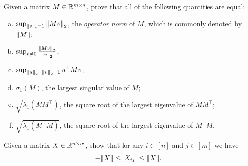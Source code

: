 \begin{myexercise}
    Given a matrix $M \in \mathbb{R}^{m \times n}$, prove that all of the following quantities are equal:
    \begin{enumerate}[(a)]
        \item $\sup_{{\left\lVert{v}\right\rVert}_2 = 1} {\left\lVert{Mv}\right\rVert}_{2}$, the \emph{operator norm} of $M$, which is commonly denoted by ${\left\lVert{M}\right\rVert}$;
        \item $\sup_{v \neq 0} \frac{{\left\lVert{Mv}\right\rVert}_{2}}{{\left\lVert{v}\right\rVert}_2}$;
        \item $\sup_{{\left\lVert{u}\right\rVert}_2 = {\left\lVert{v}\right\rVert}_2 = 1} u^\top M v$;
        \item $\sigma_1(M)$, the largest singular value of $M$;
        \item $\sqrt{\lambda_1(M M^\top)}$, the square root of the largest eigenvalue of $M M^\top$;
        \item $\sqrt{\lambda_1(M^\top M)}$, the square root of the largest eigenvalue of $M^\top M$.
    \end{enumerate}
\end{myexercise}

\begin{myexercise}\label{prob:max_entry}
    Given a matrix $X \in \mathbb{R}^{n \times m}$, show that for any $i \in [n]$ and $j \in [m]$ we have 
    \begin{equation*}
        - {\left\lVert{X}\right\rVert} \leq |X_{ij}| \leq {\left\lVert{X}\right\rVert}.
    \end{equation*}
\end{myexercise}

